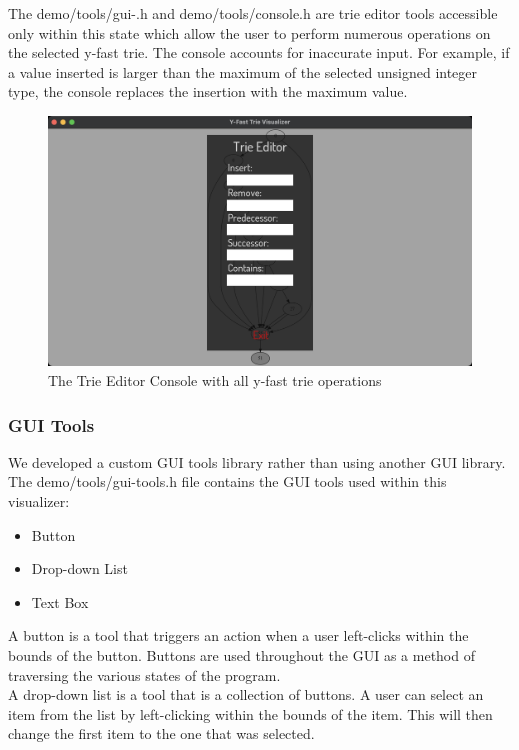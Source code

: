 \documentclass{article}
\begin{document}
\noindent
The demo/tools/gui-.h and demo/tools/console.h are trie editor tools accessible only within this state which allow the user to perform numerous operations on the selected y-fast trie. The console accounts for inaccurate input. For example, if a value inserted is larger than the maximum of the selected unsigned integer type, the console replaces the insertion with the maximum value.

\begin{figure}[h]
    \centering
    \includegraphics[width = 12cm]{input.png}
    \caption{The Trie Editor Console with all y-fast trie operations}
\end{figure}

\subsubsection{GUI Tools}
We developed a custom GUI tools library rather than using another GUI library. The demo/tools/gui-tools.h file contains the GUI tools used within this visualizer:

\begin{itemize}
    \item Button
    \item Drop-down List
    \item Text Box
\end{itemize}

A button is a tool that triggers an action when a user left-clicks within the bounds of the button. Buttons are used throughout the GUI as a method of traversing the various states of the program.
\\

\noindent
A drop-down list is a tool that is a collection of buttons. A user can select an item from the list by left-clicking within the bounds of the item. This will then change the first item to the one that was selected.
\\
\end{document}
